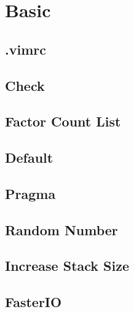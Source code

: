 \documentclass[a4paper,10pt,twocolumn,oneside]{article}
\begin{document}
\pagestyle{fancy}
\fancyfoot{}
\fancyhead[R]{\thepage}
\renewcommand{\headrulewidth}{0.4pt}
\renewcommand{\contentsname}{Contents}


\scriptsize
\tableofcontents


\section{Basic}

\subsection{.vimrc}


\subsection{Check}


\subsection{Factor Count List}


\subsection{Default}


\subsection{Pragma}


\subsection{Random Number}


\subsection{Increase Stack Size}


\subsection{FasterIO}

\end{document}
